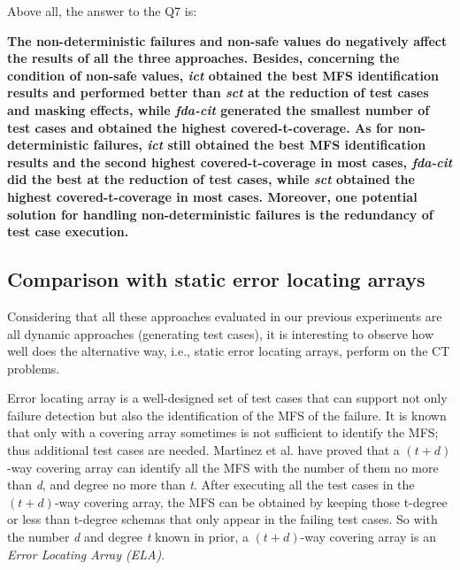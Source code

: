 \documentclass[journal,12pt,onecolumn,draftclsnofoot,]{IEEEtran}
\begin{document}

Above all, the answer to the Q7 is:

{\color{red} \textbf{The non-deterministic failures and non-safe values do negatively affect the results of all the three approaches. Besides, concerning the condition of non-safe values, \emph{ict} obtained the best MFS identification results and performed better than \emph{sct} at the reduction of test cases and masking effects, while \emph{fda-cit} generated the smallest number of test cases and obtained the highest covered-t-coverage. As for non-deterministic failures, \emph{ict} still obtained the best MFS identification results and the second highest covered-t-coverage in most cases, \emph{fda-cit }did the best at the reduction of test cases, while \emph{sct} obtained the highest covered-t-coverage in most cases. Moreover, one potential solution for handling non-deterministic failures is the redundancy of test case execution.}
}



\subsection{Comparison with static error locating arrays}
Considering  that all these approaches evaluated in our previous  experiments are all dynamic approaches (generating test cases), it is interesting to observe how well does the alternative way,  i.e., static error locating arrays, perform on the CT problems.

Error locating array\cite{colbourn2008locating,martinez2009locating} is a well-designed set of test cases that can support not only failure detection but also the identification of the MFS of the failure. It is known that only with a covering array sometimes is not sufficient to identify the MFS; thus additional test cases are needed. Mart{\'\i}nez et al.\cite{martinez2008algorithms} have proved that a $(t + d)$-way covering array can identify all the MFS with the number of them no more than \emph{d}, and degree no more than \emph{t}.
After executing all the test cases in the $(t + d)$-way covering array, the MFS can be obtained by keeping those t-degree or less than t-degree schemas that only appear in the failing test cases.  So with the number \emph{d} and degree \emph{t} known in prior, a $(t + d)$-way covering array is an \emph{Error Locating Array (ELA)}.
\end{document}
